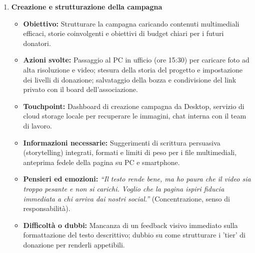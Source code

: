 \documentclass[11pt,a4paper]{article}
\begin{document}
\begin{enumerate}
        \item \textbf{Creazione e strutturazione della campagna}
        \begin{itemize}
            \item \textbf{Obiettivo:} Strutturare la campagna caricando contenuti multimediali efficaci, storie coinvolgenti e obiettivi di budget chiari per i futuri donatori.
            \item \textbf{Azioni svolte:} Passaggio al PC in ufficio (ore 15:30) per caricare foto ad alta risoluzione e video; stesura della storia del progetto e impostazione dei livelli di donazione; salvataggio della bozza e condivisione del link privato con il board dell'associazione.
            \item \textbf{Touchpoint:} Dashboard di creazione campagna da Desktop, servizio di cloud storage locale per recuperare le immagini, chat interna con il team di lavoro.
            \item \textbf{Informazioni necessarie:} Suggerimenti di scrittura persuasiva (storytelling) integrati, formati e limiti di peso per i file multimediali, anteprima fedele della pagina su PC e smartphone.
            \item \textbf{Pensieri ed emozioni:} \textit{``Il testo rende bene, ma ho paura che il video sia troppo pesante e non si carichi. Voglio che la pagina ispiri fiducia immediata a chi arriva dai nostri social.''} (Concentrazione, senso di responsabilità).
            \item \textbf{Difficoltà o dubbi:} Mancanza di un feedback visivo immediato sulla formattazione del testo descrittivo; dubbio su come strutturare i 'tier' di donazione per renderli appetibili.
        \end{itemize}


\end{enumerate}
\end{document}
